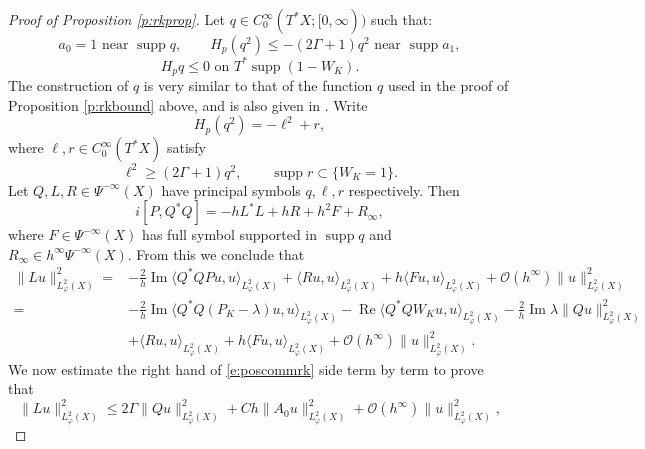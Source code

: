 \documentclass[reqno, 12pt]{amsart}
\newcommand \Oh {\mathcal{O}}
\newcommand \la {\langle}
\newcommand \ra {\rangle}
\DeclareMathOperator \re {Re}
\DeclareMathOperator \im {Im}
\DeclareMathOperator \supp {supp}
\theoremstyle{definition}
\numberwithin{equation}{section}
\numberwithin{prop}{section}
\numberwithin{figure}{section}
\begin{document}
\begin{proof}[Proof of Proposition \ref{p:rkprop}]
Let $q \in C_0^\infty(T^*X;[0,\infty))$ such that:
\begin{equation}\label{e:rkpropesc1}
a_0 = 1 \textrm{ near }\supp q, \qquad H_p (q^2) \le - (2 \Gamma + 1) q^2 \textrm{ near } \supp a_1,
\end{equation}
\begin{equation}\label{e:rkpropesc2}
H_pq \le 0 \textrm{ on } T^*\supp(1-W_K).
\end{equation}
The construction of $q$ is very similar to that of the function $q$  used in the proof of Proposition \ref{p:rkbound} above, and is also given in \cite[Lemma 5.1]{Datchev-Vasy:Gluing}. Write
\[
H_p (q^2) = -\ell^2 + r,
\]
where $\ell,r \in C_0^\infty(T^*X)$ satisfy 
\begin{equation}\label{e:derk}
\ell^2 \ge (2 \Gamma + 1)q^2, \qquad \supp r \subset \{W_K = 1\}.
\end{equation}
Let $Q,L,R \in \Psi^{-\infty}(X)$ have principal symbols $q,\ell,r$ respectively. Then
\[
i[P,Q^*Q] = -hL^*L + hR +h^2F + R_\infty,
\]
where $F \in \Psi^{-\infty}(X)$ has full symbol supported in $\supp q$ and $R_\infty \in h^\infty \Psi^{-\infty}(X)$. From this we conclude that
\begin{equation}\label{e:poscommrk}\begin{split}
\|L u\|_{L^2_\varphi(X)}^2 =  &-\frac 2 h \im \la Q^*Q P u,u \ra_{L^2_\varphi(X)}+ \la Ru,u\ra_{L^2_\varphi(X)} + h\la F u,u\ra_{L^2_\varphi(X)} + \Oh(h^\infty)\|u\|_{L^2_\varphi(X)}^2\\
=&-\frac2h \im \la Q^*Q(P_K - \lambda)u,u\ra_{L^2_\varphi(X)} - \re\la Q^*QW_K u,u\ra_{L^2_\varphi(X)} - \frac 2 h \im \lambda\|Qu\|_{L^2_\varphi(X)}^2\\
&+ \la Ru,u\ra_{L^2_\varphi(X)} + h\la F u,u\ra_{L^2_\varphi(X)} + \Oh(h^\infty)\|u\|_{L^2_\varphi(X)}^2.
\end{split}\end{equation}
We now estimate the right hand of \eqref{e:poscommrk} side term by term to prove that
\begin{equation}\label{e:pklinduc}
\|Lu\|_{L^2_\varphi(X)}^2 \le 2 \Gamma \|Qu\|_{L^2_\varphi(X)}^2 + C h \|A_0 u\|_{L^2_\varphi(X)}^2 +  \Oh(h^\infty)\|u\|_{L^2_\varphi(X)}^2,

\end{equation}
\end{proof}
\end{document}
